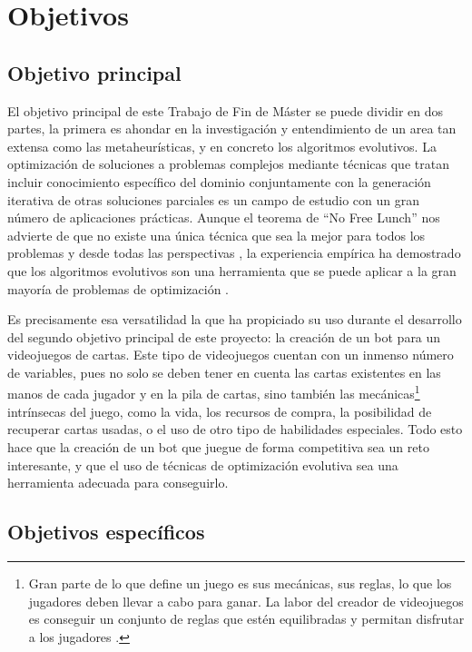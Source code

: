 \chapter{Objetivos} \label{chap:objetivos}


\section{Objetivo principal} \label{sec:objetivo_principal}

El objetivo principal de este Trabajo de Fin de Máster se puede dividir en dos partes, la primera es ahondar en la investigación y entendimiento de un area tan extensa como las metaheurísticas, y en concreto los algoritmos evolutivos. La optimización de soluciones a problemas complejos mediante técnicas que tratan incluir conocimiento específico del dominio conjuntamente con la generación iterativa de otras soluciones parciales es un campo de estudio con un gran número de aplicaciones prácticas. Aunque el teorema de ``No Free Lunch'' nos advierte de que no existe una única técnica que sea la mejor para todos los problemas y desde todas las perspectivas \cite{wolpert_no_1997}, la experiencia empírica ha demostrado que los algoritmos evolutivos son una herramienta que se puede aplicar a la gran mayoría de problemas de optimización \cite{torres-jimenez_applications_2014}.

Es precisamente esa versatilidad la que ha propiciado su uso durante el desarrollo del segundo objetivo principal de este proyecto: la creación de un bot para un videojuegos de cartas. Este tipo de videojuegos cuentan con un inmenso número de variables, pues no solo se deben tener en cuenta las cartas existentes en las manos de cada jugador y en la pila de cartas, sino también las mecánicas\footnote{Gran parte de lo que define un juego es sus mecánicas, sus reglas, lo que los jugadores deben llevar a cabo para ganar. La labor del creador de videojuegos es conseguir un conjunto de reglas que estén equilibradas y permitan disfrutar a los jugadores \cite{wikipedia_diseno_2025}.} intrínsecas del juego, como la vida, los recursos de compra, la posibilidad de recuperar cartas usadas, o el uso de otro tipo de habilidades especiales. Todo esto hace que la creación de un bot que juegue de forma competitiva sea un reto interesante, y que el uso de técnicas de optimización evolutiva sea una herramienta adecuada para conseguirlo.

\section{Objetivos específicos} \label{sec:objetivos_especificos}

